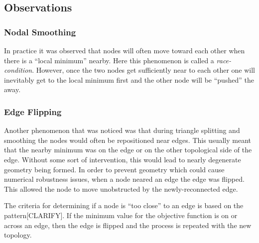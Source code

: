 \subsection{Observations}
\subsubsection{Nodal Smoothing}
In practice it was observed that nodes will often move toward each other
when there is a ``local minimum'' nearby. Here this phenomenon is called
a {\it race-condition}. However, once the two nodes get sufficiently
near to each other one will inevitably get to the local minimum first
and the other node will be ``pushed'' the away.

\subsubsection{Edge Flipping}
Another phenomenon that was noticed was that during triangle splitting
and smoothing the nodes would often be repositioned near edges. This
usually meant that the nearby minimum was on the edge or on the other
topological side of the edge. Without some sort of intervention, this
would lead to nearly degenerate geometry being formed. In order to
prevent geometry which could cause numerical robustness issues, when a
node neared an edge the edge was flipped. This allowed the node to move
unobstructed by the newly-reconnected edge.

The criteria for determining if a node is ``too close'' to an edge is
based on the pattern[CLARIFY]. If the minimum value for the objective
function is on or across an edge, then the edge is flipped and the
process is repeated with the new topology.
